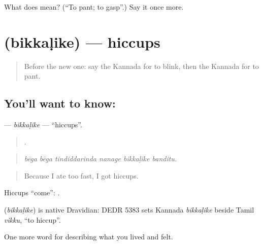 \begin{tcolorbox}[breakable,colback=teal!4,colframe=teal!35!black,title={Before you move on}]
What does   mean? (\textquotedblleft{}To pant; to gasp\textquotedblright{}.) Say it once more.
\end{tcolorbox}
\section[\texorpdfstring{\kn{ಬಿಕ್ಕಳಿಕೆ} (bikkaḷike)}{ಬಿಕ್ಕಳಿಕೆ (bikkaḷike)}]{ (bikkaḷike) — hiccups}

\label{lesson:KA-C507-bikkalike}



\begin{quote}
Before the new one: say the Kannada for to blink, then the Kannada for to pant.
\end{quote}

\subsection*{You'll want to know: }
\textbf{} — \emph{bikkaḷike} — \textquotedblleft{}hiccups\textquotedblright{}.

\begin{quote}
     .
\end{quote}

\begin{quote}
\emph{bēga bēga tindiddarinda nanage bikkaḷike banditu.}
\end{quote}

\begin{quote}
Because I ate too fast, I got hiccups.
\end{quote}

Hiccups \textquotedblleft{}come\textquotedblright{}:  .

\begin{cousinweb}
\textbf{} (\emph{bikkaḷike}) is native Dravidian: DEDR 5383 sets Kannada \emph{bikkaḷike} beside Tamil \emph{vikku}, \textquotedblleft{}to hiccup\textquotedblright{}.
\end{cousinweb}

\begin{grammarlens}[title={What you've built}]
One more word for describing what you lived and felt.
\end{grammarlens}

